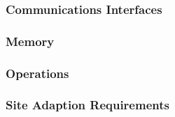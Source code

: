 \documentclass[a4paper,12pt]{article}
\begin{document}
\subsubsection{Communications Interfaces}

\subsubsection{Memory}

\subsubsection{Operations}

\subsubsection{Site Adaption Requirements}
\end{document}
